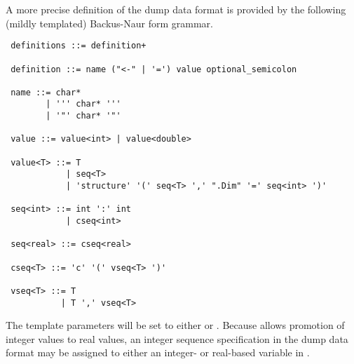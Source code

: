 A more precise definition of the dump data format is provided
by the following (mildly templated) Backus-Naur form grammar.

{\small 
\begin{verbatim}
 definitions ::= definition+

 definition ::= name ("<-" | '=') value optional_semicolon

 name ::= char* 
        | ''' char* ''' 
        | '"' char* '"'

 value ::= value<int> | value<double>

 value<T> ::= T 
            | seq<T>
            | 'structure' '(' seq<T> ',' ".Dim" '=' seq<int> ')'

 seq<int> ::= int ':' int
            | cseq<int>

 seq<real> ::= cseq<real>

 cseq<T> ::= 'c' '(' vseq<T> ')'

 vseq<T> ::= T
           | T ',' vseq<T>
\end{verbatim}
}
\noindent
The template parameters  will be set to either  or
.  Because \Stan allows promotion of integer values to real
values, an integer sequence specification in the dump data format may
be assigned to either an integer- or real-based variable in \Stan.










